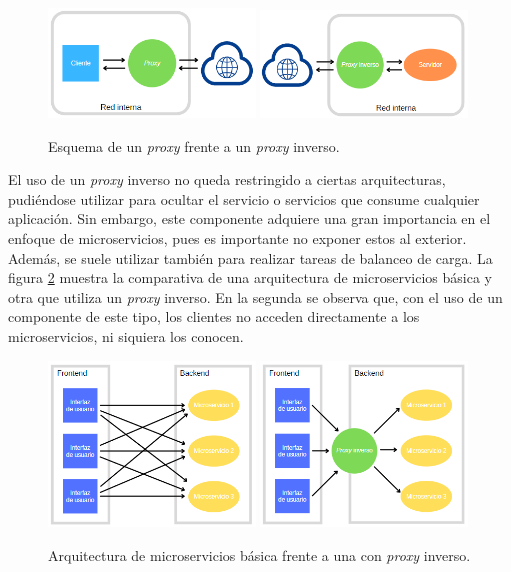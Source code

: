 \documentclass[11pt,spanish,listoffigures]{tfgetsinf}
\begin{document}
\begin{figure}[ht]
\centering
\includegraphics[width=0.49\textwidth]{imagenes/proxy}
\includegraphics[width=0.49\textwidth]{imagenes/proxyInverso}
\caption{Esquema de un \emph{proxy} frente a un \emph{proxy} inverso.}
	\label{proxyContraProxyInverso}
\end{figure}

El uso de un \emph{proxy} inverso no queda restringido a ciertas arquitecturas, pudiéndose utilizar para ocultar el servicio o servicios que consume cualquier aplicación. Sin embargo, este componente adquiere una gran importancia en el enfoque de microservicios, pues es importante no exponer estos al exterior. Además, se suele utilizar también para realizar tareas de balanceo de carga. La figura \ref{proxyInversoContraNoProxyInverso} muestra la comparativa de una arquitectura de microservicios básica y otra que utiliza un \emph{proxy} inverso. En la segunda se observa que, con el uso de un componente de este tipo, los clientes no acceden directamente a los microservicios, ni siquiera los conocen.

\begin{figure}[ht]
\centering
\includegraphics[width=0.49\textwidth]{imagenes/arquitecturaMicroserviciosBasica}
\includegraphics[width=0.49\textwidth]{imagenes/arquitecturaMicroserviciosConProxyInverso}
\caption{Arquitectura de microservicios básica frente a una con \emph{proxy} inverso.}
	\label{proxyInversoContraNoProxyInverso}
\end{figure}
\end{document}
